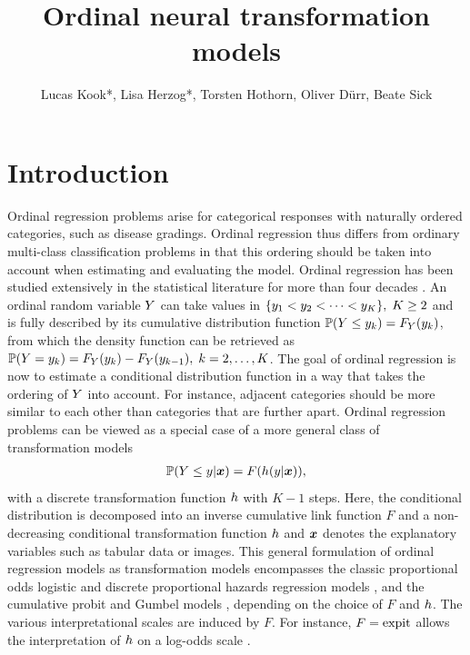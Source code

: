 \documentclass[article,nojss,shortnames]{jss}\usepackage[]{graphicx}\usepackage[]{color}
\author{Lucas Kook*, Lisa Herzog*, Torsten Hothorn, Oliver D\"urr, Beate Sick}
\title{Ordinal neural transformation models}
\begin{document}
\section{Introduction}

Ordinal regression problems arise for categorical responses with naturally
ordered categories, such as disease gradings. Ordinal regression thus differs from
ordinary multi-class classification problems in that this ordering should be taken
into account when estimating and evaluating the model.
Ordinal regression has been studied extensively in the statistical literature
for more than four decades \citep{mccullagh1980regression, genter1985goodness}.
An ordinal random variable $Y$ can take values in
$\{y_1 < y_2 < \dots < y_K\}, \; K \geq 2$ and is fully described by
its cumulative distribution function $\mathbb{P}(Y \leq y_k) = F_Y(y_k)$, from
which the density function can be retrieved as
$\mathbb{P}(Y = y_k) = F_Y(y_k) - F_Y(y_{k-1}), \; k = 2, \dots, K$.
The goal of ordinal regression is now to estimate a conditional distribution
function in a way that takes the ordering of $Y$ into account. For instance,
adjacent categories should be more similar to each other than categories that
are further apart.
Ordinal regression problems can be viewed as a special case of a more general
class of transformation models
\begin{align} \label{eq:ctm}
  \mathbb{P}(Y \leq y \rvert \boldsymbol x) = F(h(y \rvert \boldsymbol x)),
\end{align}
with a discrete transformation function $h$ with $K - 1$ steps.
Here, the conditional distribution is decomposed into an inverse cumulative link
function $F$ and a non-decreasing conditional transformation function $h$ and
$\boldsymbol x$ denotes the explanatory variables such as tabular data or images.
This general formulation of ordinal regression models as transformation models
\citep{hothorn2014conditional, hothorn2018most} encompasses the classic
proportional odds logistic and discrete proportional hazards regression models
\citep{mccullagh1980regression}, and the cumulative probit and Gumbel models
\citep{tutz2011regression}, depending on the choice of $F$ and $h$.
The various interpretational scales are induced by $F$. For instance, $F = \operatorname{expit}$
allows the interpretation of $h$ on a log-odds scale \citet{tutz2011regression}.
\end{document}
